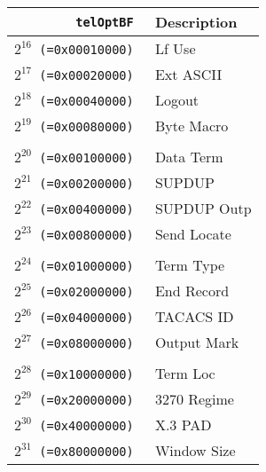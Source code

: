 \documentclass[documentation]{subfiles}
\begin{document}
\begin{minipage}{.48\textwidth}
    \begin{longtable}{>{\tt}rl}
        \toprule
        {\bf telOptBF} & {\bf Description} \\
        \midrule\endhead%
        $2^{16}$ (=0x00010000) & Lf Use\\
        $2^{17}$ (=0x00020000) & Ext ASCII\\
        $2^{18}$ (=0x00040000) & Logout\\
        $2^{19}$ (=0x00080000) & Byte Macro\\
        \\
        $2^{20}$ (=0x00100000) & Data Term\\
        $2^{21}$ (=0x00200000) & SUPDUP\\
        $2^{22}$ (=0x00400000) & SUPDUP Outp\\
        $2^{23}$ (=0x00800000) & Send Locate\\
        \\
        $2^{24}$ (=0x01000000) & Term Type\\
        $2^{25}$ (=0x02000000) & End Record\\
        $2^{26}$ (=0x04000000) & TACACS ID\\
        $2^{27}$ (=0x08000000) & Output Mark\\
        \\
        $2^{28}$ (=0x10000000) & Term Loc\\
        $2^{29}$ (=0x20000000) & 3270 Regime\\
        $2^{30}$ (=0x40000000) & X.3 PAD\\
        $2^{31}$ (=0x80000000) & Window Size\\
        \bottomrule
    \end{longtable}
\end{minipage}
\end{document}
